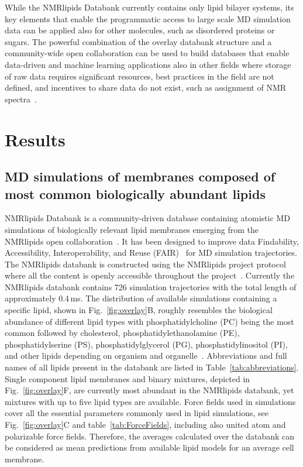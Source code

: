 \documentclass[fleqn,10pt]{wlscirep}
\begin{document}
While the NMRlipids Databank currently contains only lipid bilayer systems, its key elements that enable the programmatic access to large scale MD simulation data can be applied also for other molecules, such as disordered proteins or sugars. The powerful combination of the overlay databank structure and a community-wide open collaboration can be used to build databases that enable data-driven and machine learning applications also in other fields where storage of raw data requires significant resources, best practices in the field are not defined, and incentives to share data do not exist, such as assignment of NMR spectra~\cite{klukowski22}. 



\section{Results}

\subsection{MD simulations of membranes composed of most common biologically abundant lipids}

NMRlipids Databank is a community-driven database containing atomistic MD simulations of biologically relevant lipid membranes emerging from the NMRlipids open collaboration~\cite{botan15,ollila16,catte16,antila19,bacle21}. It has been designed to improve data Findability, Accessibility, Interoperability, and Reuse (FAIR)~\cite{wilkinson16} for MD simulation trajectories. The NMRlipids databank is constructed using the NMRlipids project protocol where all the content is openly accessible throughout the project~\cite{botan15}. Currently the NMRlipids databank contains 726 simulation trajectories with the total length of approximately 0.4\,ms. The distribution of available simulations containing a specific lipid, shown in Fig.~\ref{fig:overlay}B, roughly resembles the biological abundance of different lipid types with phosphatidylcholine (PC) being the most common followed by cholesterol, phosphatidylethanolamine (PE), phosphatidylserine (PS), phosphatidylglycerol (PG), phosphatidylinositol (PI), and other lipids depending on organism and organelle~\cite{vanmeer08}. Abbreviations and full names of all lipids present in the databank are listed in Table~\ref{tab:abbreviations}. Single component lipid membranes and binary mixtures, depicted in Fig.~\ref{fig:overlay}F, are currently most abundant in the NMRlipids databank, yet mixtures with up to five lipid types are available. Force fields used in simulations cover all the essential parameters commonly used in lipid simulations, see Fig.~\ref{fig:overlay}C and table~\ref{tab:ForceFields}, including also united atom and polarizable force fields. Therefore, the averages calculated over the databank can be considered as mean predictions from available lipid models for an average cell membrane.
\end{document}
